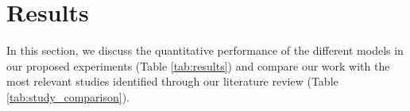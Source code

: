 \documentclass[runningheads]{llncs}
\begin{document}






\section{Results}
\label{sec:results}
In this section, we discuss the quantitative performance of the
different models in our proposed experiments (Table \ref{tab:results})
and compare our work with the most relevant studies identified through
our literature review (Table \ref{tab:study_comparison}).
\end{document}

